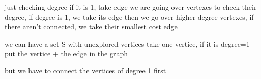 just checking degree if it is 1, take edge
we are going over vertexes to check their degree, if degree is 1, we take its edge
then we go over higher degree vertexes, if there aren't connected, we take their smallest cost edge

we can have a set S with unexplored vertices
take one vertice, if it is degree=1 put the vertice + the edge in the graph

but we have to connect the vertices  of degree 1 first